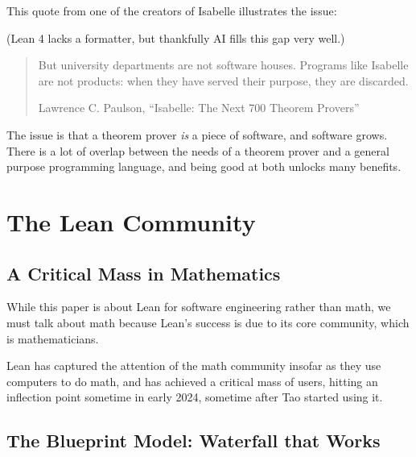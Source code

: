 \documentclass{article}
\begin{document}
This quote from one of the creators of Isabelle illustrates the issue:

(Lean 4 lacks a formatter, but thankfully AI fills this gap very well.)

\begin{quote}
  But university departments are not software houses. Programs like Isabelle are not products: when they have served
  their purpose, they are discarded.%

  Lawrence C. Paulson, ``Isabelle: The Next 700 Theorem Provers''
\end{quote}

The issue is that a theorem prover \textit{is} a piece of software, and software grows. There is a lot of overlap between the needs of a theorem prover and a general purpose programming language, and being good at both unlocks many benefits.




\section{The Lean Community}
\subsection{A Critical Mass in Mathematics}

While this paper is about Lean for software engineering rather than math, we must talk about math because Lean's success is due to its core community, which is mathematicians.

Lean has captured the attention of the math community insofar as they use computers to do math, and has achieved a critical mass of users, hitting an inflection point sometime in early 2024, sometime after Tao started using it.

\subsection{The Blueprint Model: Waterfall that Works} %
\end{document}
